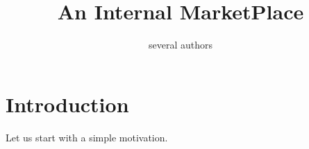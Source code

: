 \documentclass[letterpaper,12pt]{article}
\begin{document}
\title{An Internal MarketPlace}
\author{several authors}
\maketitle
\thispagestyle{fancy}
\lhead{}
\chead{}
\rhead{}
\cfoot{}
\rfoot{{\small \thepage}}

\section{Introduction}

Let us start with a simple motivation. 
\end{document}
